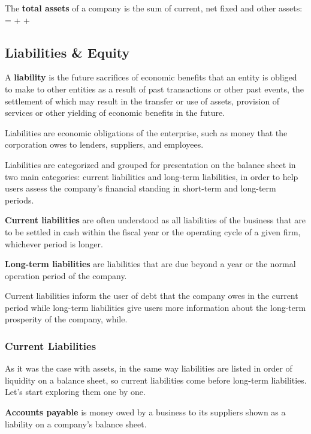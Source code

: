 The \textbf{total assets} of a company is the sum of current, net fixed and other assets:
\bse
{} =  +  + 
\ese
\ed

\subsection{Liabilities \& Equity}

\bd[Liability]
A \textbf{liability} is the future sacrifices of economic benefits that an entity is
obliged to make to other entities as a result of past transactions or other past events, the settlement of which
may result in the transfer or use of assets, provision of services or other yielding of economic benefits in the
future.
\ed

\be
Liabilities are economic obligations of the enterprise, such as money that the corporation owes to lenders, suppliers,
and employees.
\ee

Liabilities are categorized and grouped for presentation on the balance sheet in two main categories: current
liabilities and long-term liabilities, in order to help users assess the company's financial standing in short-term and
long-term periods.

\textbf{Current liabilities} are often understood as all liabilities of the business that are to be settled in cash
within the fiscal year or the operating cycle of a given firm, whichever period is longer.
\ed

\textbf{Long-term liabilities} are liabilities that are due beyond a year or the normal operation period of the company.
\ed

Current liabilities inform the user of debt that the company owes in the current period while long-term liabilities
give users more information about the long-term prosperity of the company, while.

\subsubsection{Current Liabilities}

As it was the case with assets, in the same way liabilities are listed in order of liquidity on a balance sheet, so
current liabilities come before long-term liabilities. Let's start exploring them one by one.

\textbf{Accounts payable} is money owed by a business to its suppliers shown as a liability on a company's balance
sheet.
\ed

